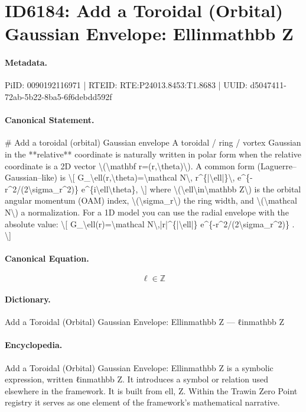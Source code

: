\section*{ID6184: Add a Toroidal (Orbital) Gaussian Envelope: Ellinmathbb Z}
\paragraph{Metadata.}
PiID: 0090192116971 | RTEID: RTE:P24013.8453:T1.8683 | UUID: d5047411-72ab-5b22-8ba5-6f6debdd592f

\paragraph{Canonical Statement.}
\# Add a toroidal (orbital) Gaussian envelope A toroidal / ring / vortex Gaussian in the **relative** coordinate is naturally written in polar form when the relative coordinate is a 2D vector \textbackslash{}(\textbackslash{}mathbf r=(r,\textbackslash{}theta)\textbackslash{}). A common form (Laguerre–Gaussian–like) is \textbackslash{}[ G\_\textbackslash{}ell(r,\textbackslash{}theta)=\textbackslash{}mathcal N\textbackslash{}, r\textasciicircum{}\{|\textbackslash{}ell|\}\textbackslash{}, e\textasciicircum{}\{-r\textasciicircum{}2/(2\textbackslash{}sigma\_r\textasciicircum{}2)\} e\textasciicircum{}\{i\textbackslash{}ell\textbackslash{}theta\}, \textbackslash{}] where \textbackslash{}(\textbackslash{}ell\textbackslash{}in\textbackslash{}mathbb Z\textbackslash{}) is the orbital angular momentum (OAM) index, \textbackslash{}(\textbackslash{}sigma\_r\textbackslash{}) the ring width, and \textbackslash{}(\textbackslash{}mathcal N\textbackslash{}) a normalization. For a 1D model you can use the radial envelope with the absolute value: \textbackslash{}[ G\_\textbackslash{}ell(r)=\textbackslash{}mathcal N\textbackslash{},|r|\textasciicircum{}\{|\textbackslash{}ell|\} e\textasciicircum{}\{-r\textasciicircum{}2/(2\textbackslash{}sigma\_r\textasciicircum{}2)\} . \textbackslash{}]

\paragraph{Canonical Equation.}
\[
\ell\in\mathbb Z
\]

\paragraph{Dictionary.}
Add a Toroidal (Orbital) Gaussian Envelope: Ellinmathbb Z — ℓinmathbb Z

\paragraph{Encyclopedia.}
Add a Toroidal (Orbital) Gaussian Envelope: Ellinmathbb Z is a symbolic expression, written ℓinmathbb Z. It introduces a symbol or relation used elsewhere in the framework. It is built from ell, Z. Within the Trawin Zero Point registry it serves as one element of the framework's mathematical narrative.

